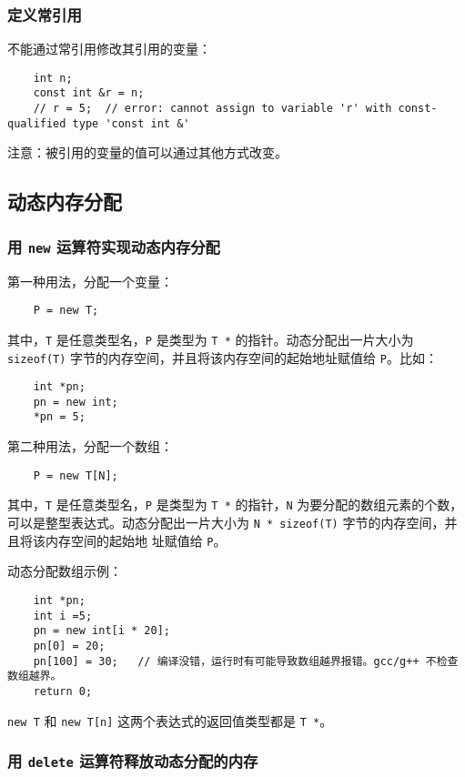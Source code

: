 \documentclass[UTF8]{ctexart}
\begin{document}
\subsubsection{定义常引用}
不能通过常引用修改其引用的变量：
\begin{verbatim}
    int n;
    const int &r = n;
    // r = 5;  // error: cannot assign to variable 'r' with const-qualified type 'const int &'
\end{verbatim}

注意：被引用的变量的值可以通过其他方式改变。

\subsection{动态内存分配}
\subsubsection{用 \texttt{new} 运算符实现动态内存分配}
第一种用法，分配一个变量：
\begin{verbatim}
    P = new T;
\end{verbatim}

其中，\texttt{T} 是任意类型名，\texttt{P} 是类型为 \texttt{T *} 的指针。动态分配出一片大小为
\texttt{sizeof(T)} 字节的内存空间，并且将该内存空间的起始地址赋值给 \texttt{P}。比如：
\begin{verbatim}
    int *pn;
    pn = new int;
    *pn = 5;
\end{verbatim}

第二种用法，分配一个数组：
\begin{verbatim}
    P = new T[N];
\end{verbatim}
其中，\texttt{T} 是任意类型名，\texttt{P} 是类型为 \texttt{T *} 的指针，\texttt{N} 为要分配的数组元素的个数，
可以是整型表达式。动态分配出一片大小为 \texttt{N * sizeof(T)} 字节的内存空间，并且将该内存空间的起始地
址赋值给 \texttt{P}。

动态分配数组示例：
\begin{verbatim}
    int *pn;
    int i =5;
    pn = new int[i * 20];
    pn[0] = 20;
    pn[100] = 30;   // 编译没错，运行时有可能导致数组越界报错。gcc/g++ 不检查数组越界。
    return 0;
\end{verbatim}

\texttt{new T} 和 \texttt{new T[n]} 这两个表达式的返回值类型都是 \texttt{T *}。

\subsubsection{用 \texttt{delete} 运算符释放动态分配的内存}
\end{document}
